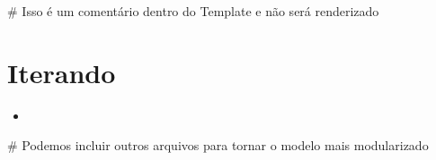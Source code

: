 \documentclass[12pt,a4paper]{article}
\newcommand{\VAR}[1]{}
\begin{document}
\#{ Isso é um comentário dentro do Template e não será renderizado }
\section{Iterando}
\begin{itemize}
    \item \VAR{i**2-1}
\end{itemize}

\#{ Podemos incluir outros arquivos para tornar o modelo mais modularizado }
 
\end{document}
